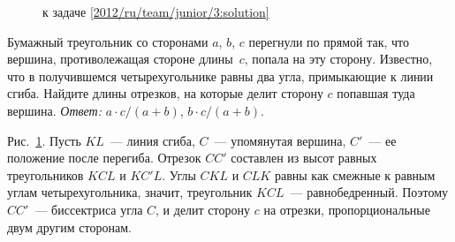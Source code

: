 \ifsolution
\begin{figure}\centering
    \caption{к задаче \ref{2012/ru/team/junior/3:solution}}
    \label{2012/ru/team/junior/3:solution:fig}
\end{figure}%
\fi %

\problem{}
Бумажный треугольник со сторонами $a$, $b$, $c$ перегнули по прямой так,
что вершина, противолежащая стороне длины~$c$, попала на эту сторону.
Известно, что в получившемся четырехугольнике равны два угла,
примыкающие к линии сгиба.
Найдите длины отрезков, на которые делит сторону $c$ попавшая туда вершина.
\solution
\label{2012/ru/team/junior/3:solution}%
\emph{Ответ:} $a \cdot c / (a + b)$, $b \cdot c / (a + b)$.
\par
Рис.~\ref{2012/ru/team/junior/3:solution:fig}.
Пусть $KL$~--- линия сгиба, $C$~--- упомянутая вершина, $C'$~--- ее
положение после перегиба.
Отрезок $CC'$ составлен из высот равных треугольников $KCL$ и $KC'L$.
Углы $CKL$ и $CLK$ равны как смежные к равным углам четырехугольника, значит,
треугольник $KCL$~--- равнобедренный.
Поэтому $CC'$~--- биссектриса угла $C$, и делит сторону $c$ на отрезки,
пропорциональные двум другим сторонам.
\endproblem
